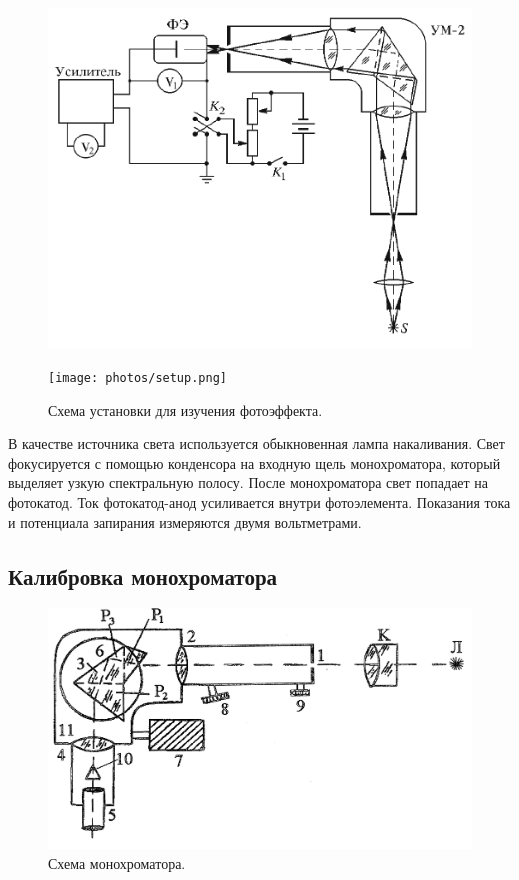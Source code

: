\documentclass[12pt,a4paper]{article}
\begin{document}
	\begin{figure}[H]
		\centering
		\begin{minipage}{0.4\textwidth}
			\centering
			\includegraphics[width=0.9\linewidth]{res/scheme.png}
		\end{minipage}%
		\begin{minipage}{0.6\textwidth}
			\centering
			\texttt{[image: photos/setup.png]}
		\end{minipage}
		\caption{Схема установки для изучения фотоэффекта.}
		\label{fig:setup}
	\end{figure}
	
	В качестве источника света используется обыкновенная лампа накаливания. Свет фокусируется с помощью конденсора на входную щель монохроматора, который выделяет узкую спектральную полосу. После монохроматора свет попадает на фотокатод. Ток фотокатод-анод усиливается внутри фотоэлемента. Показания тока и потенциала запирания измеряются двумя вольтметрами.
	
	\subsection*{Калибровка монохроматора}
	\begin{figure}
		\includegraphics[width=\linewidth]{res/um2.png}
		\caption{Схема монохроматора.}
		\label{fig:monochromator}
		\vspace{-10pt}
	\end{figure}
\end{document}
